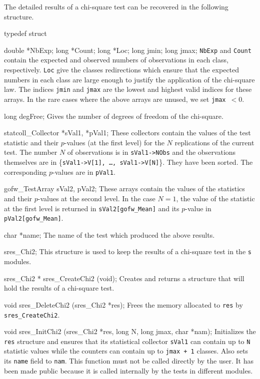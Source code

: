 The detailed results of a chi-square test can be recovered in the
following  structure.

\code

typedef struct {

   double *NbExp;
   long *Count;
   long *Loc;
   long jmin;
   long jmax;
\endcode
 \tabb
  {\tt NbExp} and {\tt Count} contain the expected and 
  observed numbers of observations in each class, respectively. 
  {\tt Loc} give the classes 
  redirections which ensure that the expected numbers in each class
  are large enough to justify the application of the chi-square law.
  The indices {\tt jmin} and {\tt jmax} are the lowest
  and highest valid indices for these arrays. In the rare cases where
  the above arrays are unused, we set {\tt jmax }$< 0$.
 \endtabb
\code

   long degFree;
\endcode
 \tabb
  Gives the number of degrees of freedom of the chi-square.
 \endtabb
\code

   statcoll_Collector *sVal1, *pVal1;
\endcode
 \tabb
  These collectors contain the values of the test statistic and their
  $p$-values  (at the first level) for the $N$ replications of the current
  test. The number $N$ of observations is in {\tt sVal1->NObs} and the
  observations themselves are in \{{\tt sVal1->V[1], \ldots, sVal1->V[N]}\}.
   They have been sorted. The corresponding $p$-values are in {\tt pVal1}.
 \endtabb
\code

   gofw_TestArray sVal2, pVal2;
\endcode
 \tabb
  These arrays contain the values of the statistics and their $p$-values
  at the second level. In the case $N=1$, the value of the  statistic at
  the first level is returned in {\tt sVal2[gofw\_Mean]} and its $p$-value
  in {\tt pVal2[gofw\_Mean]}.
 \endtabb
\code

   char *name;
\endcode
 \tabb
  The name of the test which produced the above results.
 \endtabb
\code

} sres_Chi2;
\endcode
 \tab
  This structure is used to keep the results of a chi-square
  test in the {\tt s} modules.
 \endtab
\code


sres_Chi2 * sres_CreateChi2 (void);
\endcode
 \tab 
  Creates and returns a structure that will hold the results
  of a chi-square test. 
 \endtab
\code


void sres_DeleteChi2 (sres_Chi2 *res);
\endcode
 \tab 
  Frees the memory allocated to {\tt res} by {\tt sres\_CreateChi2}.
 \endtab
\code


void sres_InitChi2 (sres_Chi2 *res, long N, long jmax, char *nam);
\endcode
 \tab 
   Initializes the {\tt res} structure and ensures that its statistical
   collector  {\tt sVal1} can contain up to  {\tt N} statistic values
   while the counters can contain up to  {\tt jmax + 1} classes. Also sets
   its  {\tt name} field to  {\tt nam}. This function must not be called
   directly by the user. It has been made public because it is called
   internally by the tests in different modules.
 \endtab
\code


